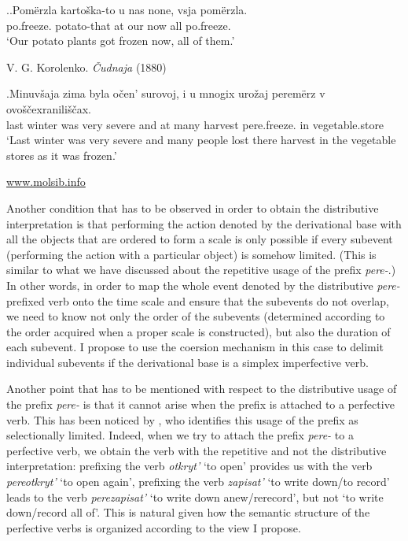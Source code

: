 \ex.\ag.\label{ex:po:merz}Pom\"{e}rzla karto\v{s}ka-to u nas none, vsja pom\"{e}rzla.\\
po.freeze. potato-that at our now all po.freeze.\\
\vspace{0.5em}
`Our potato plants got frozen now, all of them.'\\
\begin{flushright}
\vspace{-0.5em}
V. G. Korolenko. \textit{\v{C}udnaja} (1880)
\end{flushright}
\bg.\label{ex:pere:merz}Minuv\v{s}aja zima byla o\v{c}en' surovoj, i u mnogix uro\v{z}aj perem\"{e}rz v ovo\v{s}\v{c}exranili\v{s}\v{c}ax.\\
last winter was very severe and at many harvest pere.freeze. in vegetable.store\\
\vspace{0.5em}
`Last winter was very severe and many people lost there harvest in the vegetable stores as it was frozen.'\\
\begin{flushright}
\vspace{-0.5em}
\url{www.molsib.info}
\end{flushright}

Another condition that has to be observed in order to obtain the distributive interpretation is that performing the action denoted by the derivational base with all the objects that are ordered to form a scale is only possible if every subevent (performing the action with a particular object) is somehow limited. (This is similar to what we have discussed about the repetitive usage of the prefix \textit{pere-}.) In other words, in order to map the whole event denoted by the distributive \textit{pere-}prefixed verb onto the time scale and ensure that the subevents do not overlap, we need to know not only the order of the subevents (determined according to the order acquired when a proper scale is constructed), but also the duration of each subevent. I propose to use the coersion mechanism in this case to delimit individual subevents if the derivational base is a simplex imperfective verb.

Another point that has to be mentioned with respect to the distributive usage of the prefix \textit{pere-} is that it cannot arise when the prefix is attached to a perfective verb. This has been noticed by \citet{Tatevosov:09}, who identifies this usage of the prefix as selectionally limited. Indeed, when we try to attach the prefix \textit{pere-} to a perfective verb, we obtain the verb with the repetitive and not the distributive interpretation: prefixing the verb \textit{otkryt'} `to open' provides us with the verb \textit{pereotkryt'} `to open again', prefixing the verb \textit{zapisat'} `to write down/to record' leads to the verb \textit{perezapisat'} `to write down anew/rerecord', but not `to write down/record all of'. This is natural given how the semantic structure of the perfective verbs is organized according to the view I propose.

